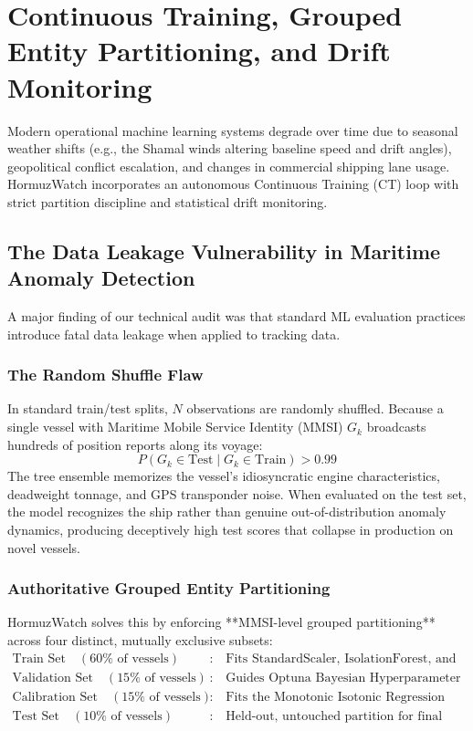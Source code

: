 \section{Continuous Training, Grouped Entity Partitioning, and Drift Monitoring}
\label{sec:mlops_ct}

Modern operational machine learning systems degrade over time due to seasonal weather shifts (e.g., the Shamal winds altering baseline speed and drift angles), geopolitical conflict escalation, and changes in commercial shipping lane usage. HormuzWatch incorporates an autonomous Continuous Training (CT) loop with strict partition discipline and statistical drift monitoring.

\subsection{The Data Leakage Vulnerability in Maritime Anomaly Detection}
A major finding of our technical audit was that standard ML evaluation practices introduce fatal data leakage when applied to tracking data.

\subsubsection{The Random Shuffle Flaw}
In standard train/test splits, $N$ observations are randomly shuffled. Because a single vessel with Maritime Mobile Service Identity (MMSI) $G_k$ broadcasts hundreds of position reports along its voyage:
\begin{equation}
P(G_k \in \text{Test} \mid G_k \in \text{Train}) > 0.99
\end{equation}
The tree ensemble memorizes the vessel's idiosyncratic engine characteristics, deadweight tonnage, and GPS transponder noise. When evaluated on the test set, the model recognizes the ship rather than genuine out-of-distribution anomaly dynamics, producing deceptively high test scores that collapse in production on novel vessels.

\subsubsection{Authoritative Grouped Entity Partitioning}
HormuzWatch solves this by enforcing **MMSI-level grouped partitioning** across four distinct, mutually exclusive subsets:
\begin{align}
\text{Train Set} \quad (60\% \text{ of vessels}) &: \quad \text{Fits StandardScaler, IsolationForest, and LOF} \\
\text{Validation Set} \quad (15\% \text{ of vessels}) &: \quad \text{Guides Optuna Bayesian Hyperparameter Optimization} \\
\text{Calibration Set} \quad (15\% \text{ of vessels}) &: \quad \text{Fits the Monotonic Isotonic Regression Calibrator} \\
\text{Test Set} \quad (10\% \text{ of vessels}) &: \quad \text{Held-out, untouched partition for final verification}
\end{align}

